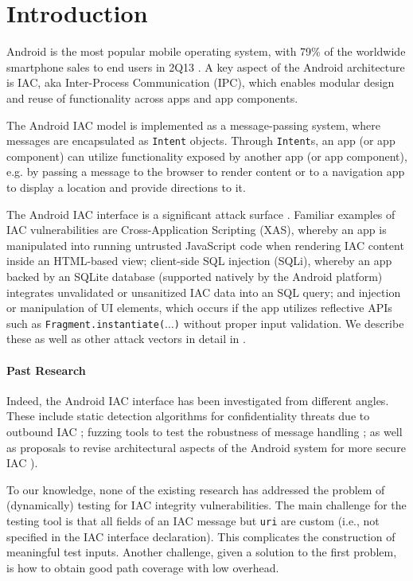 \section{Introduction}\label{Se:introduction}

Android is the most popular mobile operating system, with 79\% of the worldwide smartphone sales to end users in 2Q13 \cite{gartner-android-share}. A key aspect of the Android architecture is IAC, aka Inter-Process Communication (IPC), which enables modular design and reuse of functionality across apps and app components.

The Android IAC model is implemented as a message-passing system, where messages are encapsulated as {\tt Intent} objects. Through {\tt Intent}s, an app (or app component) can utilize functionality exposed by another app (or app component), e.g. by passing a message to the browser to render content or to a navigation app to display a location and provide directions to it. 

The Android IAC interface is a significant attack surface \cite{CPGW:MOBISYS11,MAB:DSN12,EOM:SP09}. Familiar examples of IAC vulnerabilities are Cross-Application Scripting (XAS), whereby an app is manipulated into running untrusted JavaScript code when rendering IAC content inside an HTML-based view; client-side SQL injection (SQLi), whereby an app backed by an SQLite database (supported natively by the Android platform) integrates unvalidated or unsanitized IAC data into an SQL query; and injection or manipulation of UI elements, which occurs if the app utilizes reflective APIs such as {\tt Fragment.instantiate($\ldots$)} without proper input validation. We describe these as well as other attack vectors in detail in . 

\paragraph{Past Research} Indeed, the Android IAC interface has been investigated from different angles. These include static detection algorithms for confidentiality threats due to outbound IAC \cite{EOM:SP09}; fuzzing tools to test the robustness of message handling \cite{MAB:DSN12}; as well as proposals to revise architectural aspects of the Android system for more secure IAC \cite{KCHW:SPSM12}).

To our knowledge, none of the existing research has addressed the problem of (dynamically) testing for IAC integrity vulnerabilities. The main challenge for the testing tool is that all fields of an IAC message but {\tt uri} are custom (i.e., not specified in the IAC interface declaration). This complicates the construction of meaningful test inputs. Another challenge, given a solution to the first problem, is how to obtain good path coverage with low overhead.

